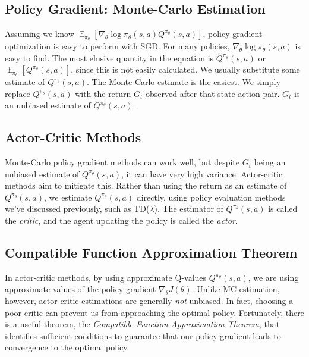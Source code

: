 \documentclass{article}
\DeclareMathOperator{\EX}{\mathbb{E}}
\newcommand{\ita}{\textit}
\begin{document}
\subsection{Policy Gradient: Monte-Carlo Estimation}

Assuming we know $\EX_{\pi_\theta}[\nabla_\theta\log \pi_\theta(s, a)Q^{\pi_\theta}(s, a)]$, policy gradient optimization is easy to perform with SGD. For many policies, $\nabla_\theta\log \pi_\theta(s, a)$ is easy to find. The most elusive quantity in the equation is $Q^{\pi_\theta}(s, a)$ or $\EX_{\pi_\theta}[Q^{\pi_\theta}(s, a)]$, since this is not easily calculated. We usually substitute some estimate of $Q^{\pi_\theta}(s, a)$. The Monte-Carlo estimate is the easiest. We simply replace $Q^{\pi_\theta}(s, a)$ with the return $G_t$ observed after that state-action pair. $G_t$ is an unbiased estimate of $Q^{\pi_\theta}(s, a)$.

\subsection{Actor-Critic Methods}

Monte-Carlo policy gradient methods can work well, but despite $G_t$ being an unbiased estimate of $Q^{\pi_\theta}(s, a)$, it can have very high variance. Actor-critic methods aim to mitigate this. Rather than using the return as an estimate of $Q^{\pi_\theta}(s, a)$, we estimate $Q^{\pi_\theta}(s, a)$ directly, using policy evaluation methods we've discussed previously, such as TD($\lambda$). The estimator of $Q^{\pi_\theta}(s, a)$ is called the \ita{critic}, and the agent updating the policy is called the \ita{actor}.

\subsection{Compatible Function Approximation Theorem}

In actor-critic methods, by using approximate Q-values $Q^{\pi_\theta}(s, a)$, we are using approximate values of the policy gradient $\nabla_\theta J(\theta)$. Unlike MC estimation, however, actor-critic estimations are generally \ita{not} unbiased. In fact, choosing a poor critic can prevent us from approaching the optimal policy. Fortunately, there is a useful theorem, the \ita{Compatible Function Approximation Theorem}, that identifies sufficient conditions to guarantee that our policy gradient leads to convergence to the optimal policy.
\end{document}
